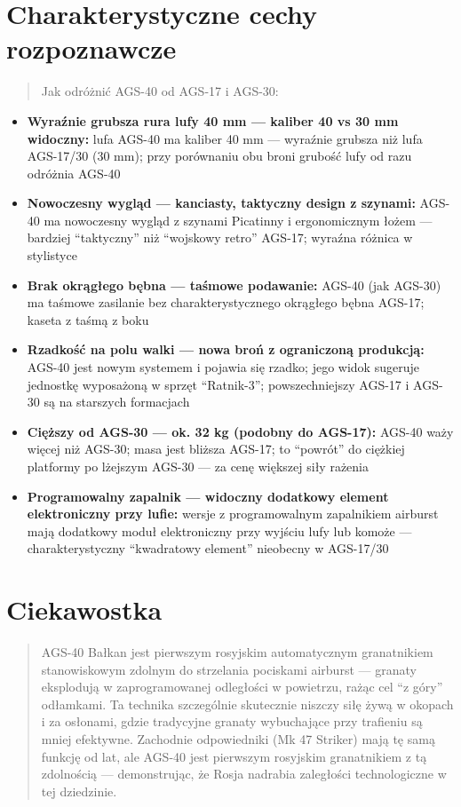 \documentclass[12pt,openany,oneside]{book}
\providecommand{\tightlist}{%
  \setlength{\itemsep}{0pt}\setlength{\parskip}{0pt}}
\begin{document}
\section{Charakterystyczne cechy
rozpoznawcze}\label{charakterystyczne-cechy-rozpoznawcze-84}

\begin{quote}
Jak odróżnić AGS-40 od AGS-17 i AGS-30:
\end{quote}

\begin{itemize}
\tightlist
\item
  \textbf{Wyraźnie grubsza rura lufy 40 mm --- kaliber 40 vs 30 mm
  widoczny:} lufa AGS-40 ma kaliber 40 mm --- wyraźnie grubsza niż lufa
  AGS-17/30 (30 mm); przy porównaniu obu broni grubość lufy od razu
  odróżnia AGS-40
\item
  \textbf{Nowoczesny wygląd --- kanciasty, taktyczny design z szynami:}
  AGS-40 ma nowoczesny wygląd z szynami Picatinny i ergonomicznym łożem
  --- bardziej ``taktyczny'' niż ``wojskowy retro'' AGS-17; wyraźna
  różnica w stylistyce
\item
  \textbf{Brak okrągłego bębna --- taśmowe podawanie:} AGS-40 (jak
  AGS-30) ma taśmowe zasilanie bez charakterystycznego okrągłego bębna
  AGS-17; kaseta z taśmą z boku
\item
  \textbf{Rzadkość na polu walki --- nowa broń z ograniczoną produkcją:}
  AGS-40 jest nowym systemem i pojawia się rzadko; jego widok sugeruje
  jednostkę wyposażoną w sprzęt ``Ratnik-3''; powszechniejszy AGS-17 i
  AGS-30 są na starszych formacjach
\item
  \textbf{Cięższy od AGS-30 --- ok. 32 kg (podobny do AGS-17):} AGS-40
  waży więcej niż AGS-30; masa jest bliższa AGS-17; to ``powrót'' do
  ciężkiej platformy po lżejszym AGS-30 --- za cenę większej siły
  rażenia
\item
  \textbf{Programowalny zapalnik --- widoczny dodatkowy element
  elektroniczny przy lufie:} wersje z programowalnym zapalnikiem
  airburst mają dodatkowy moduł elektroniczny przy wyjściu lufy lub
  komoże --- charakterystyczny ``kwadratowy element'' nieobecny w
  AGS-17/30
\end{itemize}

\section{Ciekawostka}\label{ciekawostka-84}

\begin{quote}
AGS-40 Bałkan jest pierwszym rosyjskim automatycznym granatnikiem
stanowiskowym zdolnym do strzelania pociskami airburst --- granaty
eksplodują w zaprogramowanej odległości w powietrzu, rażąc cel ``z
góry'' odłamkami. Ta technika szczególnie skutecznie niszczy siłę żywą w
okopach i za osłonami, gdzie tradycyjne granaty wybuchające przy
trafieniu są mniej efektywne. Zachodnie odpowiedniki (Mk 47 Striker)
mają tę samą funkcję od lat, ale AGS-40 jest pierwszym rosyjskim
granatnikiem z tą zdolnością --- demonstrując, że Rosja nadrabia
zaległości technologiczne w tej dziedzinie.
\end{quote}
\end{document}
